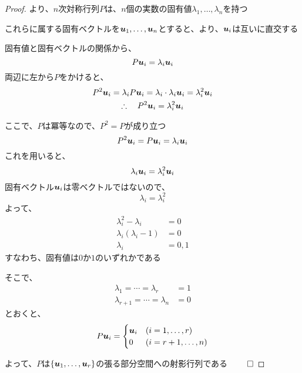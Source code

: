 \documentclass[../../../topic_linear-algebra]{subfiles}
\begin{document}
\begin{proof}
  より、$n$次対称行列$P$は、$n$個の実数の固有値$\lambda_1,\ldots,\lambda_n$を持つ

  これらに属する固有ベクトルを$\vb*{u}_1, \ldots, \vb*{u}_n$とすると、より、$\vb*{u}_i$は互いに直交する

  \br

  固有値と固有ベクトルの関係から、
  \begin{equation*}
    P\vb*{u}_i = \lambda_i \vb*{u}_i
  \end{equation*}
  両辺に左から$P$をかけると、
  \begin{gather*}
    P^2\vb*{u}_i = \lambda_i P\vb*{u}_i = \lambda_i \cdot \lambda_i \vb*{u}_i = \lambda_i^2 \vb*{u}_i \\
    \therefore \quad P^2\vb*{u}_i = \lambda_i^2 \vb*{u}_i
  \end{gather*}

  \br

  ここで、$P$は冪等なので、$P^2 = P$が成り立つ
  \begin{equation*}
    P^2\vb*{u}_i = P\vb*{u}_i = \lambda_i \vb*{u}_i
  \end{equation*}
  これを用いると、
  \begin{equation*}
    \lambda_i \vb*{u}_i = \lambda_i^2 \vb*{u}_i
  \end{equation*}
  固有ベクトル$\vb*{u}_i$は零ベクトルではないので、
  \begin{equation*}
    \lambda_i = \lambda_i^2
  \end{equation*}
  よって、
  \begin{align*}
    \lambda_i^2 - \lambda_i  & = 0     \\
    \lambda_i(\lambda_i - 1) & = 0     \\
    \lambda_i                & = 0 , 1
  \end{align*}
  すなわち、固有値は$0$か$1$のいずれかである

  \br

  そこで、
  \begin{align*}
    \lambda_1 = \cdots = \lambda_r     & = 1 \\
    \lambda_{r+1} = \cdots = \lambda_n & = 0
  \end{align*}
  とおくと、
  \begin{equation*}
    P\vb*{u}_i = \begin{cases}
      \vb*{u}_i & (i = 1,\ldots,r)   \\
      0         & (i = r+1,\ldots,n)
    \end{cases}
  \end{equation*}

  よって、$P$は$\{\vb*{u}_1, \ldots, \vb*{u}_r\}$の張る部分空間への射影行列である $\qed$
\end{proof}
\end{document}
